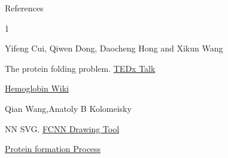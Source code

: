 \documentclass{beamer}
\begin{document}
\begin{frame}[t]{References}

\begin{thebibliography}{1}

\alert{Yifeng Cui, Qiwen Dong, Daocheng Hong and Xikun Wang}

\alert{The protein folding problem. 
\href{https://www.youtube.com/watch?v=zm-3kovWpNQ}{TEDx Talk}}

\alert{\href{https://en.wikipedia.org/wiki/Hemoglobin}{Hemoglobin Wiki}}

\alert{Qian Wang,Anatoly B Kolomeisky}

\alert{NN SVG. 
\href{http://alexlenail.me/NN-SVG/index.html}{FCNN Drawing Tool}
}

\alert{\href{https://www.youtube.com/watch?v=gG7uCskUOrA}{Protein formation Process }}

\end{thebibliography}

\end{frame}
\end{document}
